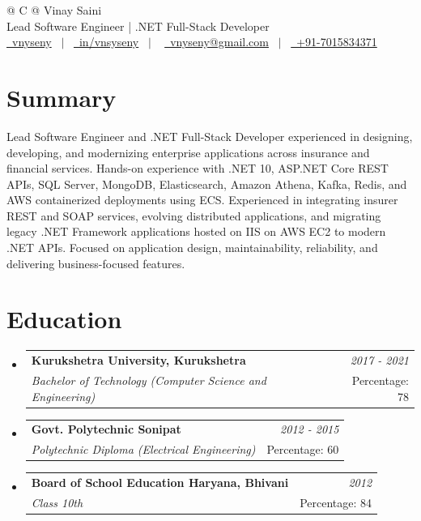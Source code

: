 \documentclass[a4paper,12pt]{article}
\makeatletter
\newcommand{\resumeSubHeadingListStart}{\begin{itemize}[leftmargin=*,labelsep=1mm,noitemsep]}
\newcommand{\resumeSubHeadingListEnd}{\end{itemize}\vspace{2mm}}
\newcommand{\resumeSubheading}[4]{
\vspace{0.5mm}\item
    \begin{tabular*}{0.98\textwidth}[t]{l@{\extracolsep{\fill}}r}
        \textbf{#1} & \textit{\footnotesize{#4}}\\
        \textit{\footnotesize{#3}} &  \footnotesize{#2}
    \end{tabular*}
}
\makeatother
\begin{document}
\pagestyle{empty} 


\begin{tabularx}{\linewidth}{@{} C @{}}
\Huge{Vinay Saini} \\[7.5pt]
{Lead Software Engineer | .NET Full-Stack Developer} \\[7.5pt]
\href{https://github.com/vnyseny}{\raisebox{-0.05\height}\faGithub\ vnyseny} \ $|$ \ 
\href{https://linkedin.com/in/vnyseny}{\raisebox{-0.05\height}\faLinkedin\ in/vnsyseny} \ $|$ \ 
\href{mailto:vnyseny@gmail.com}{\raisebox{-0.05\height}\faEnvelope \ vnyseny@gmail.com} \ $|$ \ 
\href{tel:+917015834371}{\raisebox{-0.05\height}\faMobile \ +91-7015834371} \\
\end{tabularx}


\section{Summary}
Lead Software Engineer and .NET Full-Stack Developer experienced in designing, developing, and modernizing enterprise applications across insurance and financial services. Hands-on experience with .NET 10, ASP.NET Core REST APIs, SQL Server, MongoDB, Elasticsearch, Amazon Athena, Kafka, Redis, and AWS containerized deployments using ECS. Experienced in integrating insurer REST and SOAP services, evolving distributed applications, and migrating legacy .NET Framework applications hosted on IIS on AWS EC2 to modern .NET APIs. Focused on application design, maintainability, reliability, and delivering business-focused features.

\section{\textbf{Education}}
  \resumeSubHeadingListStart
    \resumeSubheading
      {Kurukshetra University, Kurukshetra}{Percentage: 78}
      {Bachelor of Technology (Computer Science and Engineering)}{2017 - 2021}
    \resumeSubheading
      {Govt. Polytechnic Sonipat}{Percentage: 60}
      {Polytechnic Diploma (Electrical Engineering)}{2012 - 2015}
    \resumeSubheading
      {Board of School Education Haryana, Bhivani}{Percentage: 84}
      {Class 10th}{2012}
  \resumeSubHeadingListEnd
\end{document}
